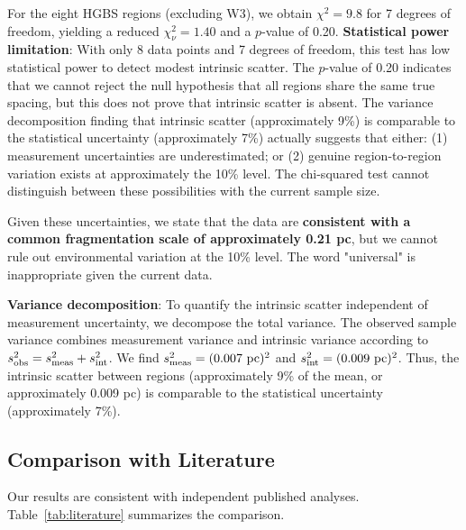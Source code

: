 \documentclass[11pt,a4paper]{article}
\begin{document}
For the eight HGBS regions (excluding W3), we obtain $\chi^2 = 9.8$ for 7 degrees of freedom, yielding a reduced $\chi^2_{\nu} = 1.40$ and a $p$-value of 0.20. \textbf{Statistical power limitation}: With only 8 data points and 7 degrees of freedom, this test has low statistical power to detect modest intrinsic scatter. The $p$-value of 0.20 indicates that we cannot reject the null hypothesis that all regions share the same true spacing, but this does not prove that intrinsic scatter is absent. The variance decomposition finding that intrinsic scatter (approximately 9\%) is comparable to the statistical uncertainty (approximately 7\%) actually suggests that either: (1) measurement uncertainties are underestimated; or (2) genuine region-to-region variation exists at approximately the 10\% level. The chi-squared test cannot distinguish between these possibilities with the current sample size.

Given these uncertainties, we state that the data are \textbf{consistent with a common fragmentation scale of approximately 0.21 pc}, but we cannot rule out environmental variation at the 10\% level. The word "universal" is inappropriate given the current data.

\textbf{Variance decomposition}: To quantify the intrinsic scatter independent of measurement uncertainty, we decompose the total variance. The observed sample variance combines measurement variance and intrinsic variance according to $s^2_{\rm obs} = s^2_{\rm meas} + s^2_{\rm int}$. We find $s^2_{\rm meas} = (0.007~{\rm pc})^2$ and $s^2_{\rm int} = (0.009~{\rm pc})^2$. Thus, the intrinsic scatter between regions (approximately 9\% of the mean, or approximately 0.009 pc) is comparable to the statistical uncertainty (approximately 7\%).

\subsection{Comparison with Literature}

Our results are consistent with independent published analyses. Table~\ref{tab:literature} summarizes the comparison.
\end{document}
